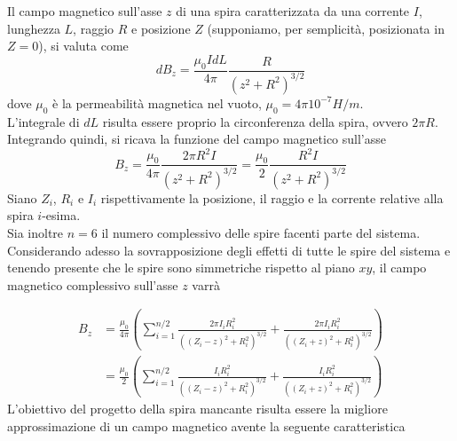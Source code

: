 \documentclass[a4paper, 11pt]{article}
\begin{document}
\noindent
Il campo magnetico sull’asse $z$  di una spira caratterizzata da una corrente
$I$, lunghezza $L$, raggio $R$ e posizione $Z$ (supponiamo, per
semplicità, posizionata in $Z=0$), si valuta come
\[dB_{z}=\frac{\mu_{0}IdL}{4\pi}\frac{R}{\left(z^{2}+R^{2}\right)^{3/2}}\]
dove $\mu_{0}$ è la permeabilità magnetica nel vuoto, $\mu_{0}=4{\pi}10^{-7}
H/m$. \\
L’integrale di $dL$ risulta essere proprio la circonferenza della spira, ovvero
$2{\pi}R$. Integrando quindi, si ricava la funzione del campo magnetico
sull'asse
\[B_{z}=\frac{\mu_{0}}{4\pi}\frac{2{\pi}R^{2}I}{\left(z^{2}+R^{2}\right)^{3/2}}=\frac{\mu_{0}}{2}\frac{R^{2}I}{\left(z^{2}+R^{2}\right)^{3/2}}\]
Siano $Z_{i}$, $R_{i}$ e $I_{i}$ rispettivamente la posizione, il raggio e la
corrente relative alla spira $i$-esima. \\
Sia inoltre $n=6$ il numero complessivo delle spire facenti parte del sistema.
Considerando adesso la sovrapposizione degli effetti di tutte le spire del
sistema e tenendo presente che le spire sono simmetriche rispetto al piano $xy$,
il campo magnetico complessivo sull’asse $z$ varrà

\begin{align*}
	B_{z}
		&=\frac{\mu_{0}}{4{\pi}}\left(\sum_{i=1}^{n/2}\frac{2{\pi}I_{i}R_{i}^{2}}{\left(\left(Z_{i}-z\right)^{2}+R_{i}^{2}\right)^{3/2}}+\frac{2{\pi}I_{i}R_{i}^{2}}{\left(\left(Z_{i}+z\right)^{2}+R_{i}^{2}\right)^{3/2}}\right)\\
		&=\frac{\mu_{0}}{2}\left(\sum_{i=1}^{n/2}\frac{I_{i}R_{i}^{2}}{\left(\left(Z_{i}-z\right)^{2}+R_{i}^{2}\right)^{3/2}}+\frac{I_{i}R_{i}^{2}}{\left(\left(Z_{i}+z\right)^{2}+R_{i}^{2}\right)^{3/2}}\right)
\end{align*}
\noindent
L'obiettivo del progetto della spira mancante risulta essere la migliore
approssimazione di un campo magnetico avente la seguente caratteristica
\end{document}
